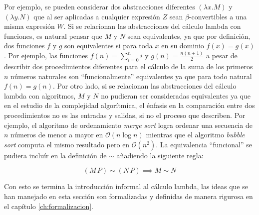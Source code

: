 Por ejemplo, se pueden considerar dos abstracciones diferentes \( (λx.M) \) y \( (λy.N) \) que al ser aplicadas a cualquier expresión \( Z \) sean \( β \)-convertibles a una misma expresión \( W \). Si se relacionan las abstracciones del cálculo lambda con funciones, es natural pensar que \( M \) y \( N \) sean equivalentes, ya que por definición, dos funciones \( f \) y \( g \) son equivalentes si para toda \( x \) en su dominio \( f(x)=g(x) \). Por ejemplo, las funciones \( f(n)=\sum_{i=0}^{n}i \) y \( g(n)=\frac{n(n+1)}{2} \) a pesar de describir dos procedimientos diferentes para el cálculo de la suma de los primeros \( n \) números naturales son ``funcionalmente'' equivalentes ya que para todo natural \( f(n)=g(n) \). Por otro lado, si se relacionan las abstracciones del cálculo lambda con algoritmos, \( M \) y \( N \) no pudieran ser consideradas equivalentes ya que en el estudio de la complejidad algorítmica, el énfasis en la comparación entre dos procedimientos no es las entradas y salidas, si no el proceso que describen. Por ejemplo, el algoritmo de ordenamiento \emph{merge sort} logra ordenar una secuencia de \( n \) números de menor a mayor en \( \mathcal{O}(n \log n) \) mientras que el algoritmo \emph{bubble sort} computa el mismo resultado pero en \( \mathcal{O}(n^2) \).  La equivalencia ``funcional'' se pudiera incluír en la definición de \( \sim \) añadiendo la siguiente regla:

\[ (M\, P) \sim (N\, P) \implies M \sim N \]

Con esto se termina la introducción informal al cálculo lambda, las ideas que se han manejado en esta sección son formalizadas y definidas de manera rigurosa en el capítulo \ref{ch:formalizacion}.

